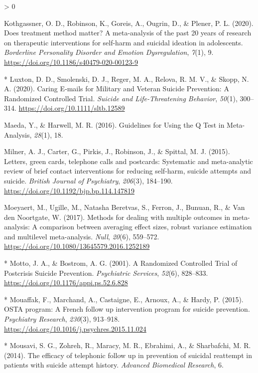 \documentclass[
  english,
  man]{apa6}
\newlength{\cslhangindent}
\newenvironment{CSLReferences}[2] %
 {%
  \setlength{\parindent}{0pt}
  \ifodd #1 \everypar{\setlength{\hangindent}{\cslhangindent}}\ignorespaces\fi
  \ifnum #2 > 0
  \setlength{\parskip}{#2\baselineskip}
  \fi
 }%
 {}
\begin{document}
\begin{CSLReferences}{1}{0}
\leavevmode\hypertarget{ref-kothgassner2020a}{}%
Kothgassner, O. D., Robinson, K., Goreis, A., Ougrin, D., \& Plener, P. L. (2020). Does treatment method matter? {A} meta-analysis of the past 20 years of research on therapeutic interventions for self-harm and suicidal ideation in adolescents. \emph{Borderline Personality Disorder and Emotion Dysregulation}, \emph{7}(1), 9. \url{https://doi.org/10.1186/s40479-020-00123-9}

\leavevmode\hypertarget{ref-luxton2020}{}%
* Luxton, D. D., Smolenski, D. J., Reger, M. A., Relova, R. M. V., \& Skopp, N. A. (2020). Caring {E}‐mails for {Military} and {Veteran Suicide Prevention}: {A Randomized Controlled Trial}. \emph{Suicide and Life-Threatening Behavior}, \emph{50}(1), 300--314. \url{https://doi.org/10.1111/sltb.12589}

\leavevmode\hypertarget{ref-maeda2016}{}%
Maeda, Y., \& Harwell, M. R. (2016). Guidelines for {Using} the {Q Test} in {Meta-Analysis}, \emph{28}(1), 18.

\leavevmode\hypertarget{ref-milner2015}{}%
Milner, A. J., Carter, G., Pirkis, J., Robinson, J., \& Spittal, M. J. (2015). Letters, green cards, telephone calls and postcards: {Systematic} and meta-analytic review of brief contact interventions for reducing self-harm, suicide attempts and suicide. \emph{British Journal of Psychiatry}, \emph{206}(3), 184--190. \url{https://doi.org/10.1192/bjp.bp.114.147819}

\leavevmode\hypertarget{ref-moeyaert2017}{}%
Moeyaert, M., Ugille, M., Natasha Beretvas, S., Ferron, J., Bunuan, R., \& Van den Noortgate, W. (2017). Methods for dealing with multiple outcomes in meta-analysis: {A} comparison between averaging effect sizes, robust variance estimation and multilevel meta-analysis. \emph{Null}, \emph{20}(6), 559--572. \url{https://doi.org/10.1080/13645579.2016.1252189}

\leavevmode\hypertarget{ref-motto2001}{}%
* Motto, J. A., \& Bostrom, A. G. (2001). A {Randomized Controlled Trial} of {Postcrisis Suicide Prevention}. \emph{Psychiatric Services}, \emph{52}(6), 828--833. \url{https://doi.org/10.1176/appi.ps.52.6.828}

\leavevmode\hypertarget{ref-mouaffak2015}{}%
* Mouaffak, F., Marchand, A., Castaigne, E., Arnoux, A., \& Hardy, P. (2015). {OSTA} program: {A French} follow up intervention program for suicide prevention. \emph{Psychiatry Research}, \emph{230}(3), 913--918. \url{https://doi.org/10.1016/j.psychres.2015.11.024}

\leavevmode\hypertarget{ref-mousavi2014}{}%
* Mousavi, S. G., Zohreh, R., Maracy, M. R., Ebrahimi, A., \& Sharbafchi, M. R. (2014). The efficacy of telephonic follow up in prevention of suicidal reattempt in patients with suicide attempt history. \emph{Advanced Biomedical Research}, 6.


\end{CSLReferences}
\end{document}
